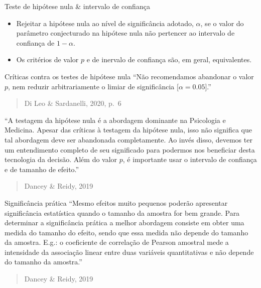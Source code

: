\documentclass[
  ignorenonframetext,
]{beamer}
\providecommand{\tightlist}{%
  \setlength{\itemsep}{0pt}\setlength{\parskip}{0pt}}
\begin{document}
\begin{frame}{Teste de hipótese nula \& intervalo de confiança}
\protect\hypertarget{teste-de-hipuxf3tese-nula-intervalo-de-confianuxe7a}{}
\begin{itemize}
\tightlist
\item
  Rejeitar a hipótese nula ao nível de significância adotado,
  \(\alpha\), se o valor do parâmetro conjecturado na hipótese nula não
  pertencer ao intervalo de confiança de \(1 - \alpha\).
\item
  Os critérios de valor \(p\) e de inervalo de confiança são, em geral,
  equivalentes.
\end{itemize}
\end{frame}

\begin{frame}{Críticas contra os testes de hipótese nula}
\protect\hypertarget{cruxedticas-contra-os-testes-de-hipuxf3tese-nula}{}
``Não recomendamos abandonar o valor \(p\), nem reduzir arbitrariamente
o limiar de significância {[}\(\alpha = 0.05\){]}.''

\begin{quote}
Di Leo \& Sardanelli, 2020, p.~6
\end{quote}

``A testagem da hipótese nula é a abordagem dominante na Psicologia e
Medicina. Apesar das críticas à testagem da hipótese nula, isso não
significa que tal abordagem deve ser abandonada completamente. Ao invés
disso, devemos ter um entendimento completo de seu significado para
podermos nos beneficiar desta tecnologia da decisão. Além do valor
\(p\), é importante usar o intervalo de confiança e de tamanho de
efeito.''

\begin{quote}
Dancey \& Reidy, 2019
\end{quote}
\end{frame}

\begin{frame}{Significância prática}
\protect\hypertarget{significuxe2ncia-pruxe1tica}{}
``Mesmo efeitos muito pequenos poderão apresentar significância
estatística quando o tamanho da amostra for bem grande. Para determinar
a significância prática a melhor abordagem consiste em obter uma medida
do tamanho do efeito, sendo que essa medida não depende do tamanho da
amostra. E.g.: o coeficiente de correlação de Pearson amostral mede a
intensidade da associação linear entre duas variáveis quantitativas e
não depende do tamanho da amostra.''

\begin{quote}
Dancey \& Reidy, 2019
\end{quote}
\end{frame}
\end{document}
